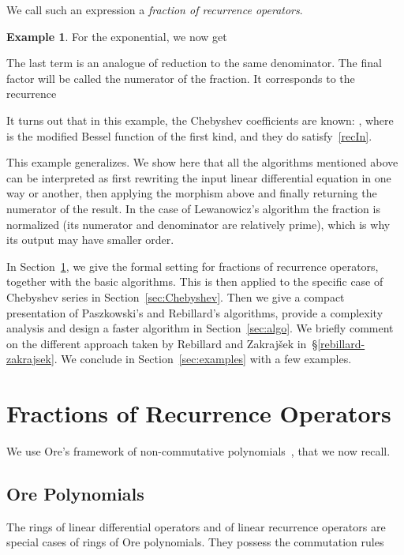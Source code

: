 \documentclass{amsart}
\theoremstyle{definition}
\newtheorem{example}{Example}
\begin{document}
We call such an expression a \emph{fraction of recurrence operators}.
\begin{example}\label{example exp} For the exponential, we now get
	 
The last term is an analogue of reduction to the same denominator. The final factor will be called the numerator of the fraction. It corresponds to the recurrence

It turns out that in this example, the Chebyshev coefficients are known:
, where~ is the modified Bessel function of the first kind, and they do satisfy~\eqref{recIn}.
\end{example}              
This example generalizes. We show here that all the algorithms mentioned above can be interpreted as first rewriting the input linear differential equation in one way or another, then applying the morphism above and finally returning the numerator of the result. In the case of Lewanowicz's algorithm the fraction is normalized (its numerator and denominator are relatively prime), which is why its output may have smaller order.

In Section~\ref{sec:Ore}, we give the formal setting for fractions of recurrence operators, together with the basic algorithms. This is then applied to the specific case of Chebyshev series in Section~\ref{sec:Chebyshev}. Then we give a compact presentation of Paszkowski's and Rebillard's algorithms, provide a complexity analysis and design a faster algorithm in Section~\ref{sec:algo}. We briefly comment on the different approach taken by Rebillard and Zakraj\v{s}ek in~\S\ref{rebillard-zakrajsek}. We conclude in Section~\ref{sec:examples} with a few examples.











\section{Fractions of Recurrence Operators}\label{sec:Ore}
We use  Ore's framework of non-commutative polynomials~\cite{Ore33}, that we now recall.
                                                                      
\subsection{Ore Polynomials}
The rings of linear differential operators and of linear recurrence operators are special cases of rings of Ore polynomials. They possess the commutation rules
\end{document}
